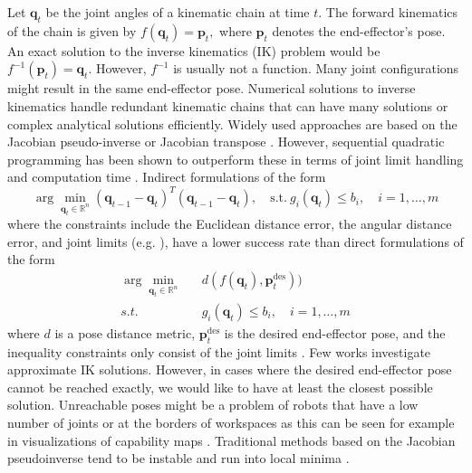 \documentclass{svproc}
\begin{document}
Let $\boldsymbol{q}_t$ be the joint angles of a kinematic chain at time $t$.
The forward kinematics of the chain is given by
$f(\boldsymbol{q}_t) = \boldsymbol{p}_t,$
where $\boldsymbol{p}_t$ denotes the end-effector's pose.
An exact solution to the inverse kinematics (IK) problem would be
$f^{-1}(\boldsymbol{p}_t) = \boldsymbol{q}_t.$
However, $f^{-1}$ is usually not a function. Many joint configurations might
result in the same end-effector pose.
Numerical solutions to inverse kinematics handle redundant kinematic
chains that can have many solutions or complex analytical solutions
efficiently.
Widely used approaches are based on the Jacobian pseudo-inverse
or Jacobian transpose \cite{Nilsson2009}. However, sequential quadratic
programming has been shown to outperform these in terms of
joint limit handling and computation time \cite{Beeson2015}.
Indirect formulations of the form
$$
\arg\min_{\boldsymbol{q}_t \in \mathbb{R}^n}
  (\boldsymbol{q}_{t-1} - \boldsymbol{q}_t)^T (\boldsymbol{q}_{t-1} - \boldsymbol{q}_t), \quad
\text{s.t.} \ g_i(\boldsymbol{q}_t) \leq b_i, \quad i = 1, \ldots, m
$$
where the constraints include the Euclidean distance error, the angular
distance error, and joint limits (e.g. \cite{Kumar2010,Fallon2015}),
have a lower success rate than direct formulations of the form
\begin{eqnarray}
\label{ikproblem1}
\arg\min_{\boldsymbol{q}_t \in \mathbb{R}^n}&&
  d(f(\boldsymbol{q}_t), \boldsymbol{p}^{\text{des}}_t))\\
\label{ikproblem2}
s.t. &&
  g_i(\boldsymbol{q}_t) \leq b_i, \quad i = 1, \ldots, m
\end{eqnarray}
where $d$ is a pose distance metric, $\boldsymbol{p}^{\text{des}}_t$
is the desired end-effector pose, and the inequality constraints only
consist of the joint limits \cite{Beeson2015}.
Few works investigate approximate IK solutions.
However, in cases where the desired end-effector pose cannot be reached
exactly, we would like to have at least the closest possible solution.
Unreachable poses might be a problem of robots that have a low number of
joints \cite{Henning2014} or at the borders of workspaces as this can be
seen for example in visualizations of capability maps \cite{Zacharias2007}.
Traditional methods based on the Jacobian pseudoinverse tend to be
instable and run into local minima \cite{Nilsson2009,Henning2014}.
\end{document}
